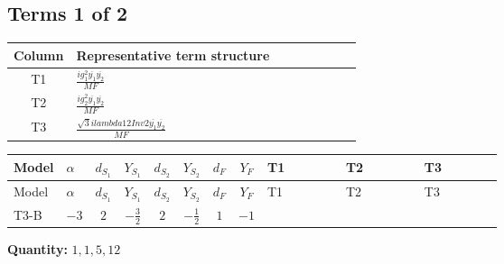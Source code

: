 \documentclass[8pt]{article}
\begin{document}
\begin{landscape}
\subsection*{Terms 1 of 2}
\begin{center}
\begin{tabular}{@{}c >{\raggedright\arraybackslash}p{0.82\linewidth}@{}}
\toprule
Column & Representative term structure \\
\midrule
T1 & \(\displaystyle \frac{i g_{1}^{2} \overline{y_{1}} \overline{y_{2}}}{MF}\) \\
\midrule
T2 & \(\displaystyle \frac{i g_{2}^{2} \overline{y_{1}} \overline{y_{2}}}{MF}\) \\
\midrule
T3 & \(\displaystyle \frac{\sqrt{3} i lambda12Inv2 \overline{y_{1}} \overline{y_{2}}}{MF}\) \\
\midrule
\bottomrule
\end{tabular}
\end{center}
\smallskip
\tiny
\begin{longtable}{@{}llcccccc >{\raggedright\arraybackslash}p{0.21\linewidth} >{\raggedright\arraybackslash}p{0.21\linewidth} >{\raggedright\arraybackslash}p{0.21\linewidth}@{}}
\toprule
Model & $\alpha$ & $d_{S_1}$ & $Y_{S_1}$ & $d_{S_2}$ & $Y_{S_2}$ & $d_F$ & $Y_F$ & T1 & T2 & T3 \\
\midrule
\endfirsthead
\toprule
Model & $\alpha$ & $d_{S_1}$ & $Y_{S_1}$ & $d_{S_2}$ & $Y_{S_2}$ & $d_F$ & $Y_F$ & T1 & T2 & T3 \\
\midrule
\endhead
T3-B & $-3$ & $2$ & $-\frac{3}{2}$ & $2$ & $-\frac{1}{2}$ & $1$ & $-1$ & \scriptsize\adjustbox{max width=\linewidth}{$\begin{gathered} - \frac{3 i g_{1}^{2} \overline{y_{1}} \overline{y_{2}}}{2 MF}\end{gathered}$} & \scriptsize\adjustbox{max width=\linewidth}{$\begin{gathered} - \frac{3 i g_{2}^{2} \overline{y_{1}} \overline{y_{2}}}{4 MF}\end{gathered}$} & \scriptsize\adjustbox{max width=\linewidth}{$\begin{gathered} - \frac{\sqrt{3} i lambda12Inv2 \overline{y_{1}} \overline{y_{2}}}{3 MF}\end{gathered}$} \\
\midrule
\bottomrule
\end{longtable}
\clearpage
\noindent\textbf{Quantity: }$\mathrm{1,1,5,12}$\par\smallskip

\end{landscape}
\end{document}

